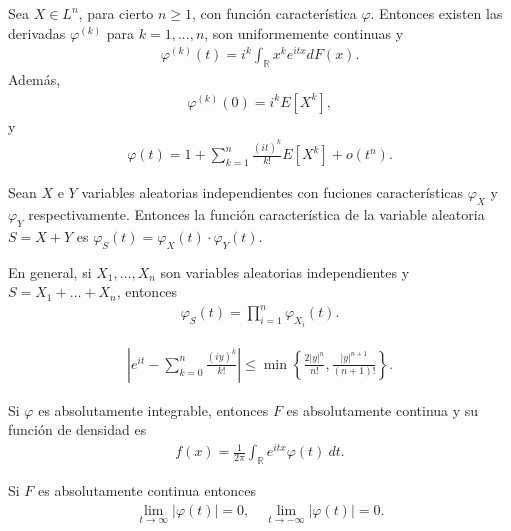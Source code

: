 \begin{teo}
    Sea $X \in L^n$, para cierto $n \ge 1$, con función característica $\varphi$. Entonces existen las derivadas $\varphi^{(k)}$ para $k = 1,...,n$, son uniformemente continuas y
    \begin{align*}
        \varphi^{(k)}(t) = i^k \int_{\mathbb{R}} x^k e^{itx} dF(x).
    \end{align*}
    Además,
    \begin{align*}
        \varphi^{(k)}(0) = i^k E[X^k],
    \end{align*}
    y
    \begin{align*}
        \varphi(t) = 1 + \sum_{k=1}^{n} \frac{(it)^k}{k!}E[X^k] + o(t^n).
    \end{align*}
\end{teo}

\begin{prop}
    Sean $X$ e $Y$ variables aleatorias independientes con fuciones características $\varphi_X$ y $\varphi_Y$ respectivamente. Entonces la función característica de la variable aleatoria $S = X + Y$ es $\varphi_S(t) = \varphi_X(t) \cdot \varphi_Y(t)$.
\end{prop}

\begin{obs}
    En general, si $X_1,\ldots,X_n$ son variables aleatorias independientes y $S = X_1 + \ldots + X_n$, entonces
    \begin{align*}
        \varphi_S(t) = \prod_{i=1}^{n} \varphi_{X_i}(t).
    \end{align*}
\end{obs}

\begin{lema}
    \begin{align*}
        \left| e^{it} - \sum_{k=0}^{n} \frac{(iy)^k}{k!} \right| \leq \min \left\{ \frac{2|y|^n}{n!}, \frac{|y|^{n+1}}{(n+1)!}\right\}.
    \end{align*}
\end{lema}

\begin{teo}
    Si $\varphi$ es absolutamente integrable, entonces $F$ es absolutamente continua y su función de densidad es
    \begin{align*}
        f(x) = \frac{1}{2\pi} \int_{\mathbb{R}} e^{itx} \varphi(t) \ dt.
    \end{align*}
\end{teo}

\begin{lema}
    Si $F$ es absolutamente continua entonces
    \begin{align*}
        \lim_{t \to \infty} |\varphi(t)| = 0, \quad \lim_{t \to -\infty} |\varphi(t)| = 0.
    \end{align*}
\end{lema}

